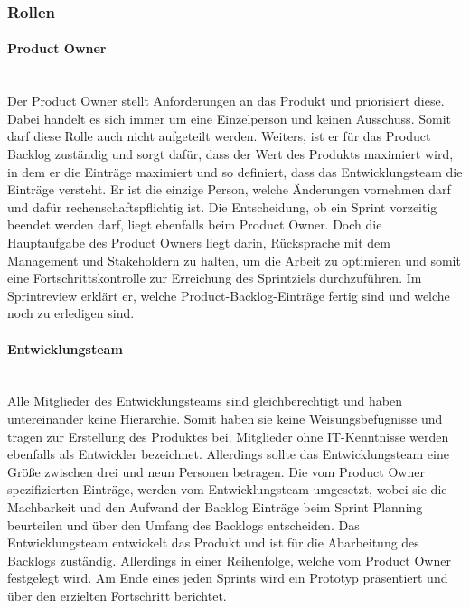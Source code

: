 \subsubsection{Rollen}   
\paragraph{Product Owner}
\leavevmode \\
Der Product Owner stellt Anforderungen an das Produkt und priorisiert diese. Dabei handelt es sich immer um eine Einzelperson und keinen Ausschuss. Somit darf diese Rolle auch nicht aufgeteilt werden. Weiters, ist er für das Product Backlog zuständig und sorgt dafür, dass der Wert des Produkts maximiert wird, in dem er die Einträge maximiert und so definiert, dass das Entwicklungsteam die Einträge versteht. Er ist die einzige Person, welche Änderungen vornehmen darf und dafür rechenschaftspflichtig ist. Die Entscheidung, ob ein Sprint vorzeitig beendet werden darf, liegt ebenfalls beim Product Owner. Doch die Hauptaufgabe des Product Owners liegt darin, Rücksprache mit dem Management und Stakeholdern zu halten, um die Arbeit zu optimieren und somit eine Fortschrittskontrolle zur Erreichung des Sprintziels durchzuführen. Im Sprintreview erklärt er, welche Product-Backlog-Einträge fertig sind und welche noch zu erledigen sind. 

\paragraph{Entwicklungsteam}
\leavevmode \\
Alle Mitglieder des Entwicklungsteams sind gleichberechtigt und haben untereinander keine Hierarchie. Somit haben sie keine Weisungsbefugnisse und tragen zur Erstellung des Produktes bei. Mitglieder ohne IT-Kenntnisse werden ebenfalls als Entwickler bezeichnet. Allerdings sollte das Entwicklungsteam eine Größe zwischen drei und neun Personen betragen. Die vom Product Owner spezifizierten Einträge, werden vom Entwicklungsteam umgesetzt, wobei sie die Machbarkeit und den Aufwand der Backlog Einträge beim Sprint Planning beurteilen und über den Umfang des Backlogs entscheiden. Das Entwicklungsteam entwickelt das Produkt und ist für die Abarbeitung des Backlogs zuständig. Allerdings in einer Reihenfolge, welche vom Product Owner festgelegt wird. Am Ende eines jeden Sprints wird ein Prototyp präsentiert und über den erzielten Fortschritt berichtet. 

